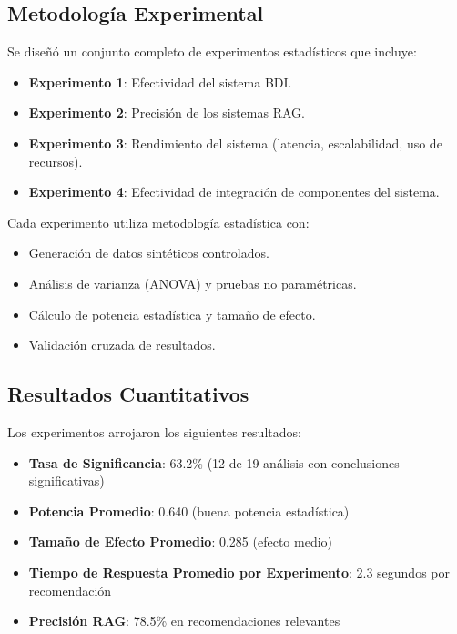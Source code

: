 \documentclass[runningheads,a4paper]{llncs}
\begin{document}
\subsection{Metodología Experimental}

Se diseñó un conjunto completo de experimentos estadísticos que incluye:

\begin{itemize}
    \item \textbf{Experimento 1}: Efectividad del sistema BDI.
    \item \textbf{Experimento 2}: Precisión de los sistemas RAG.
    \item \textbf{Experimento 3}: Rendimiento del sistema (latencia, escalabilidad, uso de recursos).
    \item \textbf{Experimento 4}: Efectividad de integración de componentes del sistema.
\end{itemize}

Cada experimento utiliza metodología estadística con:
\begin{itemize}
    \item Generación de datos sintéticos controlados.
    \item Análisis de varianza (ANOVA) y pruebas no paramétricas.
    \item Cálculo de potencia estadística y tamaño de efecto.
    \item Validación cruzada de resultados.
\end{itemize}

\subsection{Resultados Cuantitativos}

Los experimentos arrojaron los siguientes resultados:

\begin{itemize}
    \item \textbf{Tasa de Significancia}: 63.2\% (12 de 19 análisis con conclusiones significativas)
    \item \textbf{Potencia Promedio}: 0.640 (buena potencia estadística)
    \item \textbf{Tamaño de Efecto Promedio}: 0.285 (efecto medio)
    \item \textbf{Tiempo de Respuesta Promedio por Experimento}: 2.3 segundos por recomendación
    \item \textbf{Precisión RAG}: 78.5\% en recomendaciones relevantes
\end{itemize}
\end{document}
